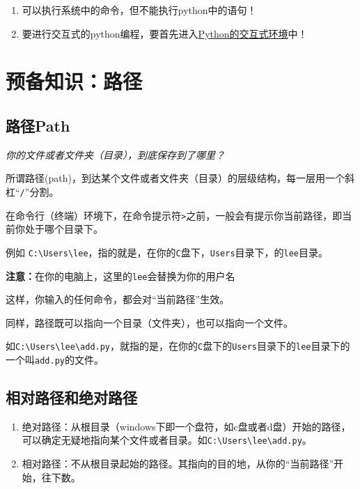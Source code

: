 \documentclass[
]{book}
\providecommand{\tightlist}{%
  \setlength{\itemsep}{0pt}\setlength{\parskip}{0pt}}
\begin{document}
\begin{enumerate}
\def\labelenumi{\arabic{enumi}.}
\tightlist
\item
  可以执行系统中的命令，但不能执行python中的语句！
\item
  要进行交互式的python编程，要首先进入\protect\hyperlink{python_interactive}{Python的交互式环境}中！
\end{enumerate}

\hypertarget{ux9884ux5907ux77e5ux8bc6ux8defux5f84}{%
\section{预备知识：路径}\label{ux9884ux5907ux77e5ux8bc6ux8defux5f84}}

\hypertarget{path}{%
\subsection{路径Path}\label{path}}

\emph{你的文件或者文件夹（目录），到底保存到了哪里？}

所谓路径(path)，到达某个文件或者文件夹（目录）的层级结构，每一层用一个斜杠``\texttt{/}''分割。

在命令行（终端）环境下，在命令提示符\texttt{\textgreater{}}之前，一般会有提示你当前路径，即当前你处于哪个目录下。

例如 \texttt{C:\textbackslash{}Users\textbackslash{}lee}，指的就是，在你的\texttt{C}盘下，\texttt{Users}目录下，的\texttt{lee}目录。

{\textbf{注意：}}在你的电脑上，这里的\texttt{lee}会替换为你的用户名

这样，你输入的任何命令，都会对``当前路径''生效。

同样，路径既可以指向一个目录（文件夹），也可以指向一个文件。

如\texttt{C:\textbackslash{}Users\textbackslash{}lee\textbackslash{}add.py}，就指的是，在你的\texttt{C}盘下的\texttt{Users}目录下的\texttt{lee}目录下的一个叫\texttt{add.py}的文件。

\hypertarget{ux76f8ux5bf9ux8defux5f84ux548cux7eddux5bf9ux8defux5f84}{%
\subsection{相对路径和绝对路径}\label{ux76f8ux5bf9ux8defux5f84ux548cux7eddux5bf9ux8defux5f84}}

\begin{enumerate}
\def\labelenumi{\arabic{enumi}.}
\tightlist
\item
  绝对路径：从根目录（windows下即一个盘符，如c盘或者d盘）开始的路径，可以确定无疑地指向某个文件或者目录。如\texttt{C:\textbackslash{}Users\textbackslash{}lee\textbackslash{}add.py}。
\item
  相对路径：不从根目录起始的路径。其指向的目的地，从你的``当前路径''开始，往下数。
\end{enumerate}
\end{document}
